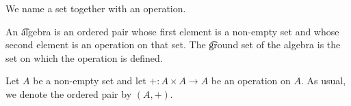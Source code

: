 

We name a set together with an operation.


An \t{algebra} is an ordered pair whose first element is a non-empty set and whose second element is an operation on that set.
The \t{ground set} of the algebra is the set on which the operation is defined.


Let $A$ be a non-empty set and let $+: A \times A \to A$ be an operation on $A$.
As usual, we denote the ordered pair by $(A, +)$.

\blankpage
